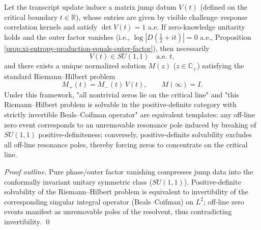 \begin{theorem}\label{thm:xi-su11-rhp-equivalence}
Let the transcript update induce a matrix jump datum \(V(t)\) (defined on the critical boundary \(t\in\mathbb{R}\)), whose entries are given by visible challenge--response correlation kernels and satisfy \(\det V(t)=1\) a.e.
If zero-knowledge unitarity holds and the outer factor vanishes (i.e., \(\log|D(\tfrac12+it)|=0\) a.e., Proposition \ref{prop:xi-entropy-production-equals-outer-factor}), then necessarily
\[
\boxed{\;V(t)\in SU(1,1)\quad\text{a.e. }t,\;}
\]
and there exists a unique normalized solution \(M(z)\) (\(z\in\mathbb{C}_+\)) satisfying the standard Riemann--Hilbert problem
\[
M_+(t)=M_-(t)\,V(t),
\qquad
M(\infty)=I.
\]
Under this framework, "all nontrivial zeros lie on the critical line" and "this Riemann--Hilbert problem is solvable in the positive-definite category with strictly invertible Beals--Coifman operator" are equivalent templates: any off-line zero event corresponds to an unremovable resonance pole induced by breaking of \(SU(1,1)\) positive-definiteness; conversely, positive-definite solvability excludes all off-line resonance poles, thereby forcing zeros to concentrate on the critical line.
\end{theorem}
\begin{proof}[Proof outline]
Pure phase/outer factor vanishing compresses jump data into the conformally invariant unitary symmetric class (\(SU(1,1)\)).
Positive-definite solvability of the Riemann--Hilbert problem is equivalent to invertibility of the corresponding singular integral operator (Beals--Coifman) on \(L^2\); off-line zero events manifest as unremovable poles of the resolvent, thus contradicting invertibility. \qed
\end{proof}

